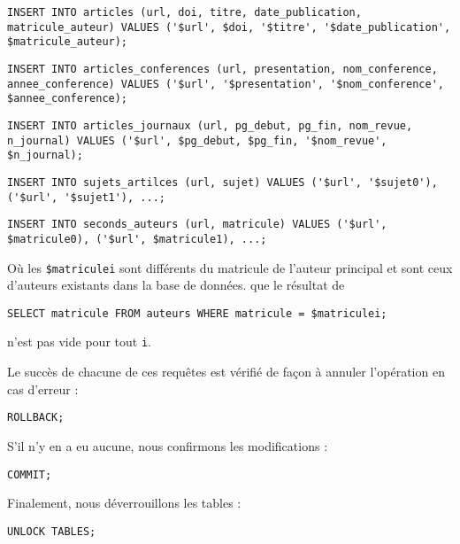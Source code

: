 \documentclass[a4paper, 12pt]{article}
\begin{document}
    \begin{description}[leftmargin=*]
        \item[articles]\mbox{}
        \begin{lstlisting}[style=sql, gobble=12]
            INSERT INTO articles (url, doi, titre, date_publication, matricule_auteur) VALUES ('$url', $doi, '$titre', '$date_publication', $matricule_auteur);
        \end{lstlisting}
        \item[articles\_conferences]\mbox{}
        \begin{lstlisting}[style=sql, gobble=12]
            INSERT INTO articles_conferences (url, presentation, nom_conference, annee_conference) VALUES ('$url', '$presentation', '$nom_conference', $annee_conference);
        \end{lstlisting}
        \item[articles\_journaux]\mbox{}
        \begin{lstlisting}[style=sql, gobble=12]
            INSERT INTO articles_journaux (url, pg_debut, pg_fin, nom_revue, n_journal) VALUES ('$url', $pg_debut, $pg_fin, '$nom_revue', $n_journal);
        \end{lstlisting}
        \item[sujets\_articles]\mbox{}
        \begin{lstlisting}[style=sql, gobble=12]
            INSERT INTO sujets_artilces (url, sujet) VALUES ('$url', '$sujet0'), ('$url', '$sujet1'), ...;
        \end{lstlisting}
        \item[seconds\_auteurs]\mbox{}
        \begin{lstlisting}[style=sql, gobble=12]
            INSERT INTO seconds_auteurs (url, matricule) VALUES ('$url', $matricule0), ('$url', $matricule1), ...;
        \end{lstlisting}
        Où les \texttt{\$matriculei} sont différents du matricule de l'auteur principal et sont ceux d'auteurs existants dans la base de données. \Cad{} que le résultat de
        \begin{lstlisting}[style=sql, gobble=12]
            SELECT matricule FROM auteurs WHERE matricule = $matriculei;
        \end{lstlisting}
        n'est pas vide pour tout \texttt{i}.
    \end{description}
    Le succès de chacune de ces requêtes est vérifié de façon à annuler l'opération en cas d'erreur :
    \begin{lstlisting}[style=sql, gobble=8]
        ROLLBACK;
    \end{lstlisting}
    S'il n'y en a eu aucune, nous confirmons les modifications :
    \begin{lstlisting}[style=sql, gobble=8]
        COMMIT;
    \end{lstlisting}
    Finalement, nous déverrouillons les tables :
    \begin{lstlisting}[style=sql, gobble=8]
        UNLOCK TABLES;
    \end{lstlisting}
    \newpage
\end{document}
